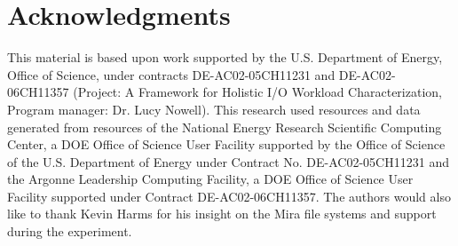 \section*{Acknowledgments}

This material is based upon work supported by the U.S. Department of Energy,
Office of Science, under contracts DE-AC02-05CH11231 and DE-AC02-06CH11357
(Project: A Framework for Holistic I/O Workload Characterization, Program
manager: Dr. Lucy Nowell).
This research used resources and data generated from resources of the
National Energy Research Scientific Computing Center, a DOE Office of
Science
User Facility supported by the Office of Science of the U.S. Department of
Energy under Contract No. DE-AC02-05CH11231 and the Argonne Leadership
Computing Facility, a DOE Office of Science User Facility supported under
Contract DE-AC02-06CH11357.  The authors would also like to thank Kevin Harms for his insight on the Mira file systems and support during the experiment.